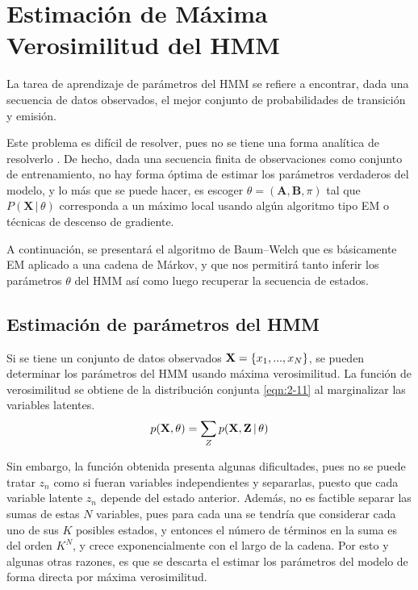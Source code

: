
\section{Estimación de Máxima Verosimilitud del HMM}

La tarea de aprendizaje de parámetros del \ac{HMM} se refiere a encontrar, dada una secuencia de datos observados, el mejor conjunto de probabilidades de transición y emisión.

Este problema es difícil de resolver, pues no se tiene una forma analítica de resolverlo \cite{Rabiner1989}. De hecho, dada una secuencia finita de observaciones como conjunto de entrenamiento, no hay forma óptima de estimar los parámetros verdaderos del modelo, y lo más que se puede hacer, es escoger $\theta = \left( \textbf{A}, \textbf{B}, \pi \right)$ tal que $P(\textbf{X} \,|\, \theta)$ corresponda a un máximo local usando algún algoritmo tipo \ac{EM} o técnicas de descenso de gradiente. 

A continuación, se presentará el algoritmo de Baum–Welch que es básicamente \ac{EM} aplicado a una cadena de Márkov, y que nos permitirá tanto inferir los parámetros $\theta$ del \ac{HMM} así como luego recuperar la secuencia de estados.

\subsection{Estimación de parámetros del HMM}

Si se tiene un conjunto de datos observados $\textbf{X} = \lbrace x_1, ..., x_N \rbrace$, se pueden determinar los parámetros del \ac{HMM} usando máxima verosimilitud. La función de verosimilitud se obtiene de la distribución conjunta \eqref{eqn:2-11} al marginalizar las variables latentes.
\begin{equation}
  p(\textbf{X}, \theta) = \sum_Z p(\textbf{X}, \textbf{Z} \,|\, \theta)
\label{eqn:3-1}
\end{equation}

Sin embargo, la función obtenida presenta algunas dificultades, pues no se puede tratar $z_n$ como si fueran variables independientes y separarlas, puesto que cada variable latente $z_n$ depende del estado anterior. Además, no es factible separar las sumas de estas $N$ variables, pues para cada una se tendría que considerar cada uno de sus $K$ posibles estados, y entonces el número de términos en la suma es del orden $K^N$, y crece exponencialmente con el largo de la cadena. Por esto y algunas otras razones, es que se descarta el estimar los parámetros del modelo de forma directa por máxima verosimilitud.

